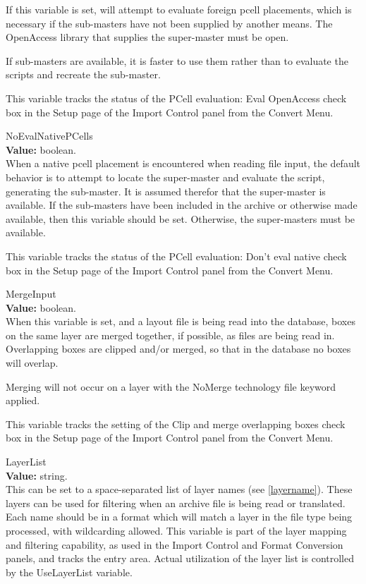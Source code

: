 \begin{description}
If this variable is set, {\Xic} will attempt to evaluate foreign pcell
placements, which is necessary if the sub-masters have not been
supplied by another means.  The OpenAccess library that supplies the
super-master must be open.
 
If sub-masters are available, it is faster to use them rather than
to evaluate the scripts and recreate the sub-master.
 
This variable tracks the status of the {\cb PCell evaluation:  Eval
OpenAccess} check box in the {\cb Setup} page of the {\cb Import
Control} panel from the {\cb Convert Menu}.

\item{\et NoEvalNativePCells}\\
{\bf Value:} boolean.\\
When a native pcell placement is encountered when reading file input,
the default behavior is to attempt to locate the super-master and
evaluate the script, generating the sub-master.  It is assumed
therefor that the super-master is available.  If the sub-masters have
been included in the archive or otherwise made available, then this
variable should be set.  Otherwise, the super-masters must be
available.

This variable tracks the status of the {\cb PCell evaluation:  Don't
eval native} check box in the {\cb Setup} page of the {\cb Import
Control} panel from the {\cb Convert Menu}.

\item{\et MergeInput}\\
{\bf Value:} boolean.\\
When this variable is set, and a layout file is being read into the
database, boxes on the same layer are merged together, if possible, as
files are being read in.  Overlapping boxes are clipped and/or merged,
so that in the database no boxes will overlap.
 
Merging will not occur on a layer with the {\vt NoMerge} technology
file keyword applied.
 
This variable tracks the setting of the {\cb Clip and merge
overlapping boxes} check box in the {\cb Setup} page of the {\cb
Import Control} panel from the {\cb Convert Menu}.

\item{\et LayerList}\\
{\bf Value:} string.\\
This can be set to a space-separated list of layer names (see
\ref{layername}).  These layers can be used for filtering when an
archive file is being read or translated.  Each name should be in a
format which will match a layer in the file type being processed, with
wildcarding allowed.  This variable is part of the layer mapping and
filtering capability, as used in the {\cb Import Control} and {\cb
Format Conversion} panels, and tracks the entry area.  Actual
utilization of the layer list is controlled by the {\et UseLayerList}
variable.


\end{description}
